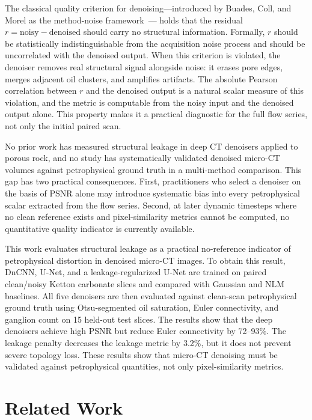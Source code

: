\documentclass[review,12pt]{elsarticle}
\begin{document}
The classical quality criterion for denoising---introduced by Buades,
Coll, and Morel as the method-noise framework~\cite{Buades2005siam}---
holds that the residual $r = \mathrm{noisy} - \mathrm{denoised}$ should
carry no structural information.  Formally, $r$ should be statistically
indistinguishable from the acquisition noise process and should be
uncorrelated with the denoised output.  When this criterion is violated,
the denoiser removes real structural signal alongside noise: it erases
pore edges, merges adjacent oil clusters, and amplifies artifacts.  The
absolute Pearson correlation between $r$ and the denoised output is a
natural scalar measure of this violation, and the metric is computable
from the noisy input and the denoised output alone.  This property makes
it a practical diagnostic for the full flow series, not only the initial
paired scan.

No prior work has measured structural leakage in deep CT denoisers
applied to porous rock, and no study has systematically validated
denoised micro-CT volumes against petrophysical ground truth in a
multi-method comparison.  This gap has two practical consequences.
First, practitioners who select a denoiser on the basis of PSNR alone
may introduce systematic bias into every petrophysical scalar extracted
from the flow series.  Second, at later dynamic timesteps where no clean
reference exists and pixel-similarity metrics cannot be computed, no
quantitative quality indicator is currently available.

This work evaluates structural leakage as a practical no-reference
indicator of petrophysical distortion in denoised micro-CT images.  To
obtain this result, DnCNN, U-Net, and a leakage-regularized U-Net are
trained on paired clean/noisy Ketton carbonate slices and compared with
Gaussian and NLM baselines.  All five denoisers are then evaluated
against clean-scan petrophysical ground truth using Otsu-segmented oil
saturation, Euler connectivity, and ganglion count on 15 held-out test
slices.  The results show that the deep denoisers achieve high PSNR but
reduce Euler connectivity by 72--93\%.  The leakage penalty decreases
the leakage metric by 3.2\%, but it does not prevent severe topology
loss.  These results show that micro-CT denoising must be validated
against petrophysical quantities, not only pixel-similarity metrics.

\section{Related Work}
\label{sec:related}
\end{document}
